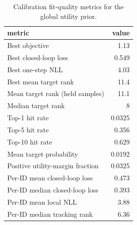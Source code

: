 \begin{table}[t]
\centering
\caption{Calibration fit-quality metrics for the global utility prior.}
\label{tab:utility_calibration_fit}
\begin{tabular}{lr}
\toprule
metric & value \\
\midrule
Best objective & 1.13 \\
Best closed-loop loss & 0.549 \\
Best one-step NLL & 4.03 \\
Best mean target rank & 11.4 \\
Mean target rank (held samples) & 11.1 \\
Median target rank & 8 \\
Top-1 hit rate & 0.0325 \\
Top-5 hit rate & 0.356 \\
Top-10 hit rate & 0.629 \\
Mean target probability & 0.0192 \\
Positive utility-margin fraction & 0.0325 \\
Per-ID mean closed-loop loss & 0.473 \\
Per-ID median closed-loop loss & 0.393 \\
Per-ID mean local NLL & 3.88 \\
Per-ID median tracking rank & 6.36 \\
\bottomrule
\end{tabular}
\end{table}
